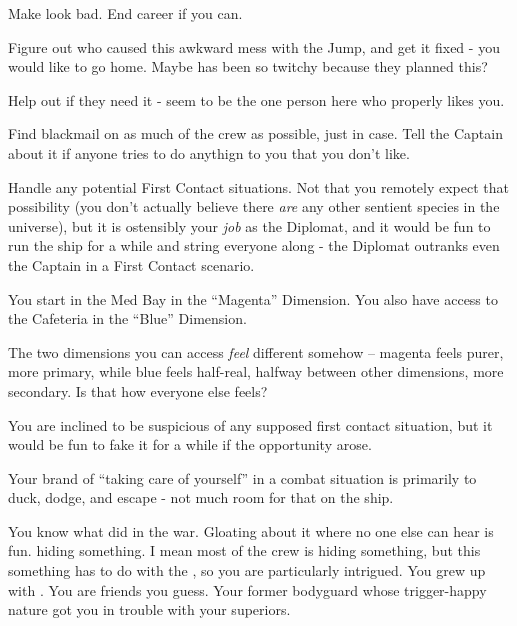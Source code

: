 \documentclass[char]{TMFHope}
\begin{document}
\begin{itemz}[Goals]
	\item Make \cWeap{} look bad. End \cWeap{\their} career if you can.
	\item Figure out who caused this awkward mess with the Jump, and get it fixed - you would like to go home. Maybe \cXO{} has been so twitchy because they planned this?
	\item Help \cMed{} out if they need it - \cMed{\they} seem\cMed{\plural} to be the one person here who properly likes you.
	\item Find blackmail on as much of the crew as possible, just in case. Tell the Captain about it if anyone tries to do anythign to you that you don't like.
	\item Handle any potential First Contact situations. Not that you remotely expect that possibility (you don't actually believe there \emph{are} any other sentient species in the universe), but it is ostensibly your \emph{job} as the Diplomat, and it would be fun to run the ship for a while and string everyone along - the Diplomat outranks even the Captain in a First Contact scenario.
\end{itemz}

\begin{itemz}[Notes]
	\item You start in the Med Bay in the ``Magenta'' Dimension. You also have access to the Cafeteria in the ``Blue'' Dimension. 
	\item The two dimensions you can access {\em feel} different somehow -- magenta feels purer, more primary, while blue feels half-real, halfway between other dimensions, more secondary.  Is that how everyone else feels?
	\item You are inclined to be suspicious of any supposed first contact situation, but it would be fun to fake it for a while if the opportunity arose.
	\item Your brand of ``taking care of yourself'' in a combat situation is primarily to duck, dodge, and escape - not much room for that on the ship.
\end{itemz}

\begin{contacts}
	\contact{\cXO{}} You know what \cXO{\they} did in the war. Gloating about it where no one else can hear is fun.
	\contact{\cSci{}} \cSci{\They} \cSci{\are} hiding something. I mean most of the crew is hiding something, but this something has to do with the \cXO{}, so you are particularly intrigued.
	\contact{\cMed{}} You grew up with \cMed{\them}. You are friends you guess.
	\contact{\cWeap{}} Your former bodyguard whose trigger-happy nature got you in trouble with your superiors.
\end{contacts}
\end{document}
